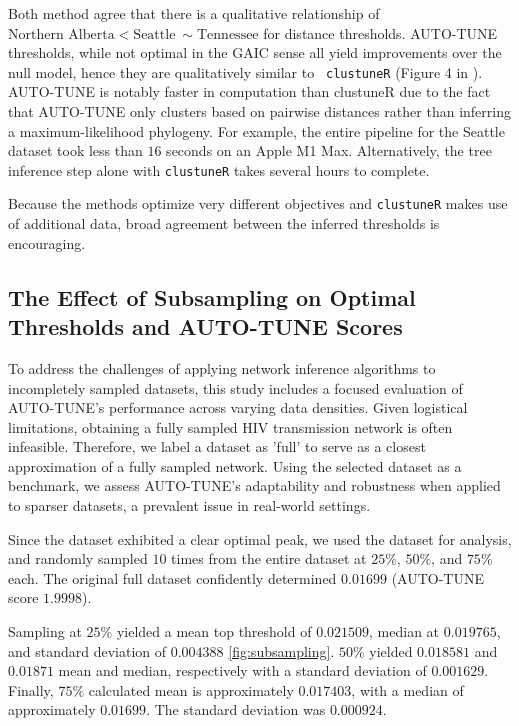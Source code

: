 \documentclass[utf8]{FrontiersinHarvard} %
\newcommand{\TODO}[1]{{\color{red}{#1}}}
\begin{document}
Both method agree that there is a qualitative relationship of $\text{Northern
		Alberta} < \text{Seattle} ~\sim \text{Tennessee}$ for distance thresholds.
AUTO-TUNE thresholds, while not optimal in the GAIC sense all yield
improvements over the null model, hence they are qualitatively similar to {\tt
		clustuneR} (Figure 4 in \cite{chato_public_2020}). AUTO-TUNE is notably faster
in computation than clustuneR due to the fact that AUTO-TUNE only clusters
based on pairwise distances rather than inferring a maximum-likelihood
phylogeny. For example, the entire pipeline for the Seattle dataset took less
than $16$ seconds on an Apple M1 Max. Alternatively, the tree inference step
alone with {\tt clustuneR} takes several hours to complete.

Because the methods optimize very different objectives and {\tt clustuneR}
makes use of additional data, broad agreement between the inferred thresholds
is encouraging.

\subsection{The Effect of Subsampling on Optimal Thresholds and AUTO-TUNE Scores}
\TODO{STEVEN, PLEASE UPDATE}

To address the challenges of applying network inference algorithms to
incompletely sampled datasets, this study includes a focused evaluation of
AUTO-TUNE's performance across varying data densities. Given logistical
limitations, obtaining a fully sampled HIV transmission network is often
infeasible. Therefore, we label a dataset as 'full' to serve as a closest
approximation of a fully sampled network. Using the selected dataset as a
benchmark, we assess AUTO-TUNE's adaptability and robustness when applied to
sparser datasets, a prevalent issue in real-world settings.

Since the \citep{rhee_national_2019} dataset exhibited a clear optimal peak, we
used the dataset for analysis, and randomly sampled $10$ times from the entire
dataset at $25\%$, $50\%$, and $75\%$ each. The original full dataset
confidently determined $0.01699$ (AUTO-TUNE score $1.9998$).

Sampling at $25\%$ yielded a mean top threshold of $0.021509$, median at
$0.019765$, and standard deviation of $0.004388$ \ref{fig:subsampling}.
$50\%$ yielded $0.018581$ and $0.01871$ mean and median, respectively with a
standard deviation of $0.001629$. Finally, $75\%$ calculated mean is
approximately $0.017403$, with a median of approximately $0.01699$. The
standard deviation was $0.000924$.
\end{document}
